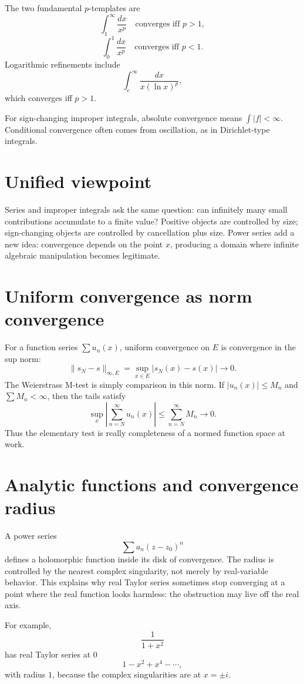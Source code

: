 The two fundamental $p$-templates are
\[
  \int_1^{\infty}\frac{dx}{x^p}
  \quad\text{converges iff }p>1,
\]
\[
  \int_0^1\frac{dx}{x^p}
  \quad\text{converges iff }p<1.
\]
Logarithmic refinements include
\[
  \int_e^{\infty}\frac{dx}{x(\ln x)^p},
\]
which converges iff $p>1$.

For sign-changing improper integrals, absolute convergence means $\int |f|<\infty$.  Conditional convergence often comes from oscillation, as in Dirichlet-type integrals.

\section{Unified viewpoint}

Series and improper integrals ask the same question: can infinitely many small contributions accumulate to a finite value?  Positive objects are controlled by size; sign-changing objects are controlled by cancellation plus size.  Power series add a new idea: convergence depends on the point $x$, producing a domain where infinite algebraic manipulation becomes legitimate.

\section{Uniform convergence as norm convergence}

For a function series $\sum u_n(x)$, uniform convergence on $E$ is convergence in the sup norm:
\[
  \|s_N-s\|_{\infty,E}=\sup_{x\in E}|s_N(x)-s(x)|\to0.
\]
The Weierstrass M-test is simply comparison in this norm.  If $|u_n(x)|\le M_n$ and $\sum M_n<\infty$, then the tails satisfy
\[
  \sup_x\left|\sum_{n=N}^{\infty}u_n(x)\right|\le \sum_{n=N}^{\infty}M_n\to0.
\]
Thus the elementary test is really completeness of a normed function space at work.

\section{Analytic functions and convergence radius}

A power series
\[
  \sum a_n(z-z_0)^n
\]
defines a holomorphic function inside its disk of convergence.  The radius is controlled by the nearest complex singularity, not merely by real-variable behavior.  This explains why real Taylor series sometimes stop converging at a point where the real function looks harmless: the obstruction may live off the real axis.

For example,
\[
  \frac1{1+x^2}
\]
has real Taylor series at $0$
\[
  1-x^2+x^4-\cdots,
\]
with radius $1$, because the complex singularities are at $x=\pm i$.

